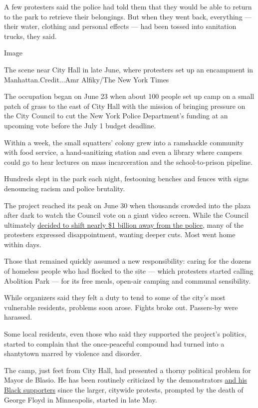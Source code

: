 A few protesters said the police had told them that they would be able
to return to the park to retrieve their belongings. But when they went
back, everything --- their water, clothing and personal effects --- had
been tossed into sanitation trucks, they said.

Image

The scene near City Hall in late June, where protesters set up an
encampment in Manhattan.Credit...Amr Alfiky/The New York Times

The occupation began on June 23 when about 100 people set up camp on a
small patch of grass to the east of City Hall with the mission of
bringing pressure on the City Council to cut the New York Police
Department's funding at an upcoming vote before the July 1 budget
deadline.

Within a week, the small squatters' colony grew into a ramshackle
community with food service, a hand-sanitizing station and even a
library where campers could go to hear lectures on mass incarceration
and the school-to-prison pipeline.

Hundreds slept in the park each night, festooning benches and fences
with signs denouncing racism and police brutality.

The project reached its peak on June 30 when thousands crowded into the
plaza after dark to watch the Council vote on a giant video screen.
While the Council ultimately
\href{https://www.nytimes3xbfgragh.onion/2020/06/30/nyregion/nypd-budget.html}{decided
to shift nearly \$1 billion away from the police}, many of the
protesters expressed disappointment, wanting deeper cuts. Most went home
within days.

Those that remained quickly assumed a new responsibility: caring for the
dozens of homeless people who had flocked to the site --- which
protesters started calling Abolition Park --- for its free meals,
open-air camping and communal sensibility.

While organizers said they felt a duty to tend to some of the city's
most vulnerable residents, problems soon arose. Fights broke out.
Passers-by were harassed.

Some local residents, even those who said they supported the project's
politics, started to complain that the once-peaceful compound had turned
into a shantytown marred by violence and disorder.

The camp, just feet from City Hall, had presented a thorny political
problem for Mayor de Blasio. He has been routinely criticized by the
demonstrators
\href{https://www.nytimes3xbfgragh.onion/2020/06/12/nyregion/de-blasio-blacks-protest.html}{and
his Black supporters} since the larger, citywide protests, prompted by
the death of George Floyd in Minneapolis, started in late May.

